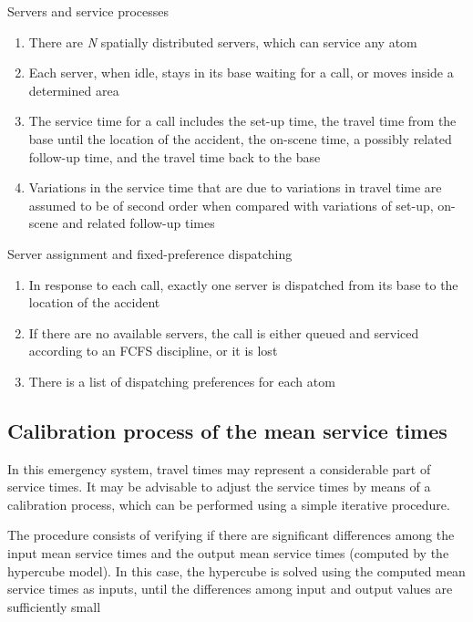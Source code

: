 \begin{frame}{Servers and service processes}
  \begin{enumerate}
  \item There are \textit{N} spatially distributed servers, 
    which can service any atom
  \item Each server, when idle, stays in its base waiting for a call, 
    or moves inside a determined area
  \item The service time for a call includes the set-up time, 
    the travel time from the base until the location of the accident, 
    the on-scene time, a possibly related follow-up time, 
    and the travel time back to the base
  \item Variations in the service time that are due to variations in travel time 
    are assumed to be of second order when compared with variations of set-up, 
    on-scene and related follow-up times
  \end{enumerate}
\end{frame}

\begin{frame}{Server assignment and fixed-preference dispatching}
  \begin{enumerate}
  \item In response to each call, 
    exactly one server is dispatched from its base to the location of the accident
  \item If there are no available servers, 
    the call is either queued and serviced according to an FCFS discipline,
    or it is lost
  \item There is a list of dispatching preferences for each atom
  \end{enumerate}
\end{frame}

\subsection{Calibration process of the mean service times}
\begin{frame}
In this emergency system, 
travel times may represent a considerable part of service times. 
It may be advisable to adjust the service times by means of a calibration process,
which can be performed using a simple iterative procedure.

The procedure consists of 
verifying if there are significant differences among 
the input mean service times and the output mean service times (computed by the hypercube model). 
In this case, 
the hypercube is solved using the computed mean service times as inputs, 
until the differences among input and output values are sufficiently small
\end{frame}

